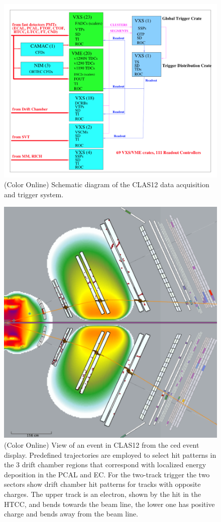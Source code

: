 \documentclass[final,3p,twocolumn]{elsarticle}
\begin{document}
\begin{figure}[htbp!]
\centerline{\includegraphics[width=1.0\columnwidth]{clas12-daq.png}}
\caption{(Color Online) Schematic diagram of the CLAS12 data acquisition and trigger system.}
\label{daq}
\end{figure}
\begin{figure}[t!]
\centerline{\includegraphics[width=0.95\columnwidth]{trigger.png}}
\caption{(Color Online) View of an event in CLAS12 from the ced event display. Predefined trajectories 
are employed to select hit
patterns in the 3 drift chamber regions that correspond with localized energy deposition
in the PCAL and EC. For the two-track trigger the two sectors show drift chamber hit patterns for tracks with
opposite charges. The upper track is an electron, shown by the hit in the HTCC, and bends towards the beam line, 
the lower one has positive charge and bends away from the beam line.}
\label{trigger}
\end{figure}
\end{document}
